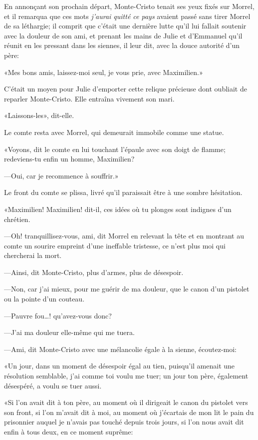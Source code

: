 En annonçant son prochain départ, Monte-Cristo tenait ses yeux fixés sur Morrel, et il remarqua que ces mots \textit{j'aurai quitté ce pays} avaient passé sans tirer Morrel de sa léthargie; il comprit que c'était une dernière lutte qu'il lui fallait soutenir avec la douleur de son ami, et prenant les mains de Julie et d'Emmanuel qu'il réunit en les pressant dans les siennes, il leur dit, avec la douce autorité d'un père: 

«Mes bons amis, laissez-moi seul, je vous prie, avec Maximilien.» 

C'était un moyen pour Julie d'emporter cette relique précieuse dont oubliait de reparler Monte-Cristo. Elle entraîna vivement son mari. 

«Laissons-les», dit-elle. 

Le comte resta avec Morrel, qui demeurait immobile comme une statue. 

«Voyons, dit le comte en lui touchant l'épaule avec son doigt de flamme; redeviens-tu enfin un homme, Maximilien? 

—Oui, car je recommence à souffrir.» 

Le front du comte se plissa, livré qu'il paraissait être à une sombre hésitation. 

«Maximilien! Maximilien! dit-il, ces idées où tu plonges sont indignes d'un chrétien. 

—Oh! tranquillisez-vous, ami, dit Morrel en relevant la tête et en montrant au comte un sourire empreint d'une ineffable tristesse, ce n'est plus moi qui chercherai la mort. 

—Ainsi, dit Monte-Cristo, plus d'armes, plus de désespoir. 

—Non, car j'ai mieux, pour me guérir de ma douleur, que le canon d'un pistolet ou la pointe d'un couteau. 

—Pauvre fou\dots! qu'avez-vous donc? 

—J'ai ma douleur elle-même qui me tuera. 

—Ami, dit Monte-Cristo avec une mélancolie égale à la sienne, écoutez-moi: 

«Un jour, dans un moment de désespoir égal au tien, puisqu'il amenait une résolution semblable, j'ai comme toi voulu me tuer; un jour ton père, également désespéré, a voulu se tuer aussi. 

«Si l'on avait dit à ton père, au moment où il dirigeait le canon du pistolet vers son front, si l'on m'avait dit à moi, au moment où j'écartais de mon lit le pain du prisonnier auquel je n'avais pas touché depuis trois jours, si l'on nous avait dit enfin à tous deux, en ce moment suprême: 

